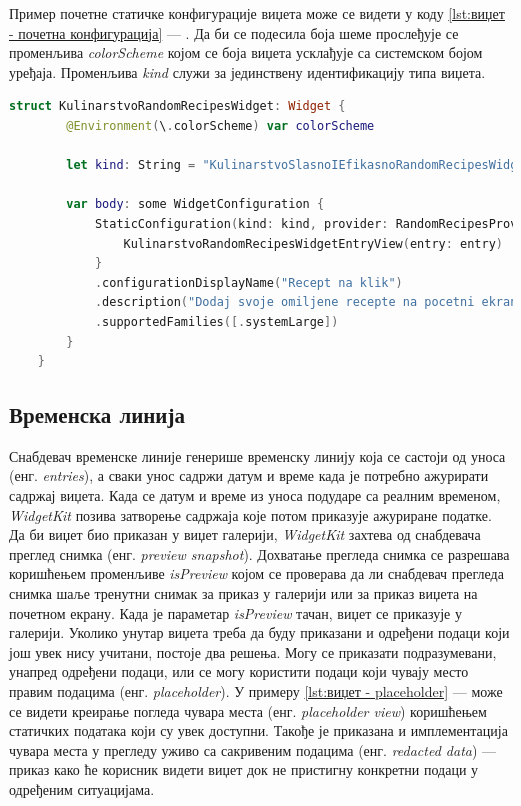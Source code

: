 \documentclass[12pt,oneside]{memoir}
\begin{document}
\indent Пример почетне статичке конфигурације виџета може се видети у коду \ref{lst:виџет - почетна конфигурација} --- . Да би се подесила боја шеме прослеђује се променљива \textit{colorScheme} којом се боја виџета усклађује са системском бојом уређаја. Променљива \textit{kind} служи за јединствену идентификацију типа виџета. 

\begin{lstlisting}[caption=\textit{{Виџет --- почетна конфигурација}}, label={lst:виџет - почетна конфигурација}, language=Swift, frame=single]
    struct KulinarstvoRandomRecipesWidget: Widget {
        @Environment(\.colorScheme) var colorScheme
        
        let kind: String = "KulinarstvoSlasnoIEfikasnoRandomRecipesWidget"
        
        var body: some WidgetConfiguration {
            StaticConfiguration(kind: kind, provider: RandomRecipesProvider()) { entry in
                KulinarstvoRandomRecipesWidgetEntryView(entry: entry)
            }
            .configurationDisplayName("Recept na klik")
            .description("Dodaj svoje omiljene recepte na pocetni ekran")
            .supportedFamilies([.systemLarge])
        }
    }
\end{lstlisting}

\subsection{Временска линија}
\label{subsec:Временска линија}
\indent Снабдевач временске линије генерише временску линију која се састоји од уноса (енг. \textit{entries}), а сваки унос садржи датум и време када је потребно ажурирати садржај виџета. Када се датум и време из уноса подударе са реалним временом, \textit{WidgetKit} позива затворење садржаја које потом приказује ажуриране податке. 
\\
\indent Да би виџет био приказан у виџет галерији, \textit{WidgetKit} захтева од снабдевача преглед снимка (енг. \textit{preview snapshot}). Дохватање прегледа снимка се разрешава коришћењем променљиве \textit{isPreview} којом се проверава да ли снабдевач прегледа снимка шаље тренутни снимак за приказ у галерији или за приказ виџета на почетном екрану. Када је параметар \textit{isPreview} тачан, виџет се приказује у галерији. Уколико унутар виџета треба да буду приказани и одређени подаци који још увек нису учитани, постоје два решења. Могу се приказати подразумевани, унапред одређени подаци, или се могу користити подаци који чувају место правим подацима (енг. \textit{placeholder}). У примеру \ref{lst:виџет - placeholder} ---  може се видети креирање погледа чувара места (енг. \textit{placeholder view}) коришћењем статичких података који су увек доступни. Такође је приказана и имплементација чувара места у прегледу уживо са сакривеним подацима (енг. \textit{redacted data}) --- приказ како ће корисник видети виџет док не пристигну конкретни подаци у одређеним ситуацијама.
\end{document}
